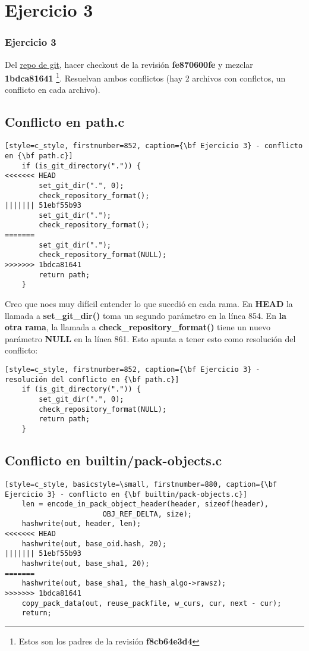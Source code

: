 \section{Ejercicio 3}
\label{exercise_03}
\subsubsection{Ejercicio 3}
Del \hyperref[git_repo]{repo de git}, hacer checkout de la revisión {\bf fe870600fe} y mezclar {\bf 1bdca81641}
\footnote{Estos son los padres de la revisión {\bf f8cb64e3d4}}. Resuelvan ambos conflictos (hay 2 archivos con conflctos,
un conflicto en cada archivo).

\subsection*{Conflicto en path.c}
\begin{lstlisting}[style=c_style, firstnumber=852, caption={\bf Ejercicio 3} - conflicto en {\bf path.c}]
	if (is_git_directory(".")) {
<<<<<<< HEAD
		set_git_dir(".", 0);
		check_repository_format();
||||||| 51ebf55b93
		set_git_dir(".");
		check_repository_format();
=======
		set_git_dir(".");
		check_repository_format(NULL);
>>>>>>> 1bdca81641
		return path;
	}
\end{lstlisting}
Creo que noes muy difícil entender lo que sucedió en cada rama. En {\bf HEAD} la llamada a {\bf set\_git\_dir()}
toma un segundo parámetro en la línea 854. En {\bf la otra rama}, la llamada a {\bf check\_repository\_format()} tiene un
nuevo parámetro {\bf NULL} en la línea 861. Esto apunta a tener esto como resolución del conflicto:

\begin{lstlisting}[style=c_style, firstnumber=852, caption={\bf Ejercicio 3} - resolución del conflicto en {\bf path.c}]
	if (is_git_directory(".")) {
		set_git_dir(".", 0);
		check_repository_format(NULL);
		return path;
	}
\end{lstlisting}

\subsection*{Conflicto en builtin/pack-objects.c}
\begin{lstlisting}[style=c_style, basicstyle=\small, firstnumber=880, caption={\bf Ejercicio 3} - conflicto en {\bf builtin/pack-objects.c}]
	len = encode_in_pack_object_header(header, sizeof(header),
					   OBJ_REF_DELTA, size);
	hashwrite(out, header, len);
<<<<<<< HEAD
	hashwrite(out, base_oid.hash, 20);
||||||| 51ebf55b93
	hashwrite(out, base_sha1, 20);
=======
	hashwrite(out, base_sha1, the_hash_algo->rawsz);
>>>>>>> 1bdca81641
	copy_pack_data(out, reuse_packfile, w_curs, cur, next - cur);
	return;
\end{lstlisting}

